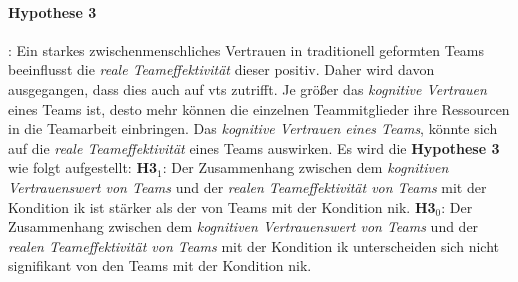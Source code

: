 \documentclass[a4paper,11pt]{article}%
\renewcommand{\\}{\vspace*{0.5\baselineskip} \newline}
\begin{document}
\paragraph{Hypothese 3}:
%
Ein starkes zwischenmenschliches Vertrauen in traditionell geformten Teams beeinflusst die \textit{reale Teameffektivität} dieser positiv. Daher wird davon ausgegangen, dass dies auch auf \ac{vts} zutrifft. 
Je größer das \textit{kognitive Vertrauen} eines Teams ist, desto mehr können die einzelnen Teammitglieder ihre Ressourcen in die Teamarbeit einbringen. 
Das \textit{kognitive Vertrauen eines Teams}, könnte sich auf die \textit{reale Teameffektivität} eines Teams auswirken. 
Es wird die \textbf{Hypothese 3} wie folgt aufgestellt:\\
\textbf{H3$_{1}$}: Der Zusammenhang zwischen dem \textit{kognitiven Vertrauenswert von Teams} und der \textit{realen Teameffektivität von Teams} mit der Kondition \ac{ik} ist stärker als der von Teams mit der Kondition \ac{nik}. \newline
\textbf{H3$_{0}$}: Der Zusammenhang zwischen dem \textit{kognitiven Vertrauenswert von Teams} und der \textit{realen Teameffektivität von Teams} mit der Kondition \ac{ik} unterscheiden sich nicht signifikant von den Teams mit der Kondition \ac{nik}. \\
%
\end{document}
